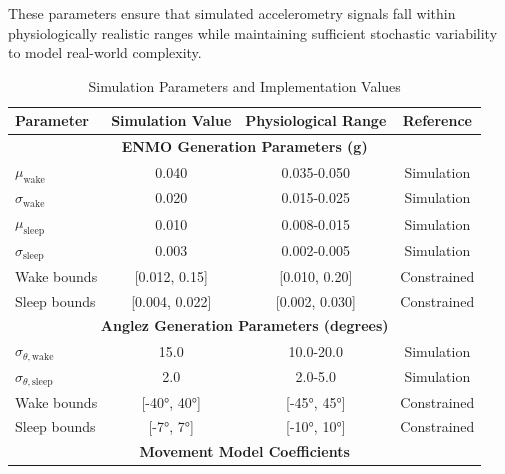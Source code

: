 \documentclass[conference]{IEEEtran}
\begin{document}
These parameters ensure that simulated accelerometry signals fall within physiologically realistic ranges while maintaining sufficient stochastic variability to model real-world complexity.

\begin{table}[H]
	\centering
	\caption{Simulation Parameters and Implementation Values}
	\label{tab:simulation_parameters}
	\begin{tabular}{|l|c|c|c|}
		\hline
		\textbf{Parameter}             & \textbf{Simulation Value} & \textbf{Physiological Range} & \textbf{Reference} \\
		\hline
		\hline
		\multicolumn{4}{|c|}{\textbf{ENMO Generation Parameters (g)}}                                                  \\
		\hline
		$\mu_{\text{wake}}$            & 0.040                     & 0.035-0.050                  & Simulation         \\
		$\sigma_{\text{wake}}$         & 0.020                     & 0.015-0.025                  & Simulation         \\
		$\mu_{\text{sleep}}$           & 0.010                     & 0.008-0.015                  & Simulation         \\
		$\sigma_{\text{sleep}}$        & 0.003                     & 0.002-0.005                  & Simulation         \\
		Wake bounds                    & [0.012, 0.15]             & [0.010, 0.20]                & Constrained        \\
		Sleep bounds                   & [0.004, 0.022]            & [0.002, 0.030]               & Constrained        \\
		\hline
		\multicolumn{4}{|c|}{\textbf{Anglez Generation Parameters (degrees)}}                                          \\
		\hline
		$\sigma_{\theta,\text{wake}}$  & 15.0                      & 10.0-20.0                    & Simulation         \\
		$\sigma_{\theta,\text{sleep}}$ & 2.0                       & 2.0-5.0                      & Simulation         \\
		Wake bounds                    & [-40°, 40°]               & [-45°, 45°]                  & Constrained        \\
		Sleep bounds                   & [-7°, 7°]                 & [-10°, 10°]                  & Constrained        \\
		\hline
		\multicolumn{4}{|c|}{\textbf{Movement Model Coefficients}}                                                     \\

\end{tabular}
\end{table}
\end{document}
